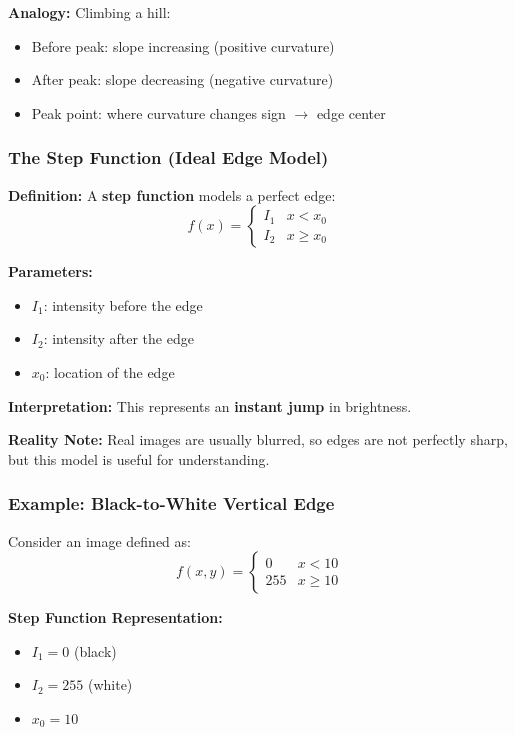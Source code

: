\documentclass[12pt]{article}
\begin{document}
\textbf{Analogy:}
Climbing a hill:
\begin{itemize}
    \item Before peak: slope increasing (positive curvature)
    \item After peak: slope decreasing (negative curvature)
    \item Peak point: where curvature changes sign $\rightarrow$ edge center
\end{itemize}

\subsubsection{The Step Function (Ideal Edge Model)}

\textbf{Definition:}
A \textbf{step function} models a perfect edge:
\[
    f(x) =
    \begin{cases}
        I_1 & x < x_0    \\
        I_2 & x \geq x_0
    \end{cases}
\]

\textbf{Parameters:}
\begin{itemize}
    \item $I_1$: intensity before the edge
    \item $I_2$: intensity after the edge
    \item $x_0$: location of the edge
\end{itemize}

\textbf{Interpretation:}
This represents an \textbf{instant jump} in brightness.

\textbf{Reality Note:}
Real images are usually blurred, so edges are not perfectly sharp, but this model is useful for understanding.

\subsubsection{Example: Black-to-White Vertical Edge}

Consider an image defined as:
\[
    f(x,y) =
    \begin{cases}
        0   & x < 10    \\
        255 & x \geq 10
    \end{cases}
\]

\textbf{Step Function Representation:}
\begin{itemize}
    \item $I_1 = 0$ (black)
    \item $I_2 = 255$ (white)
    \item $x_0 = 10$
\end{itemize}
\end{document}
